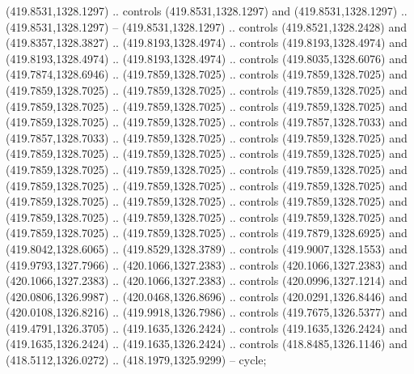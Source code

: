 \begin{scope}[shift={(-343.28256,-575.56596)}]
\begin{scope}[shift={(-736.04956,-3272.8657)}]
\begin{scope}[cm={{0.76602,-0.43388,0.43388,0.76602,(334.73826,3088.862)}}]
        (419.8531,1328.1297) .. controls (419.8531,1328.1297) and (419.8531,1328.1297)
        .. (419.8531,1328.1297) -- (419.8531,1328.1297) .. controls
        (419.8521,1328.2428) and (419.8357,1328.3827) .. (419.8193,1328.4974) ..
        controls (419.8193,1328.4974) and (419.8193,1328.4974) .. (419.8193,1328.4974)
        .. controls (419.8035,1328.6076) and (419.7874,1328.6946) ..
        (419.7859,1328.7025) .. controls (419.7859,1328.7025) and (419.7859,1328.7025)
        .. (419.7859,1328.7025) .. controls (419.7859,1328.7025) and
        (419.7859,1328.7025) .. (419.7859,1328.7025) .. controls (419.7859,1328.7025)
        and (419.7859,1328.7025) .. (419.7859,1328.7025) .. controls
        (419.7857,1328.7033) and (419.7857,1328.7033) .. (419.7859,1328.7025) ..
        controls (419.7859,1328.7025) and (419.7859,1328.7025) .. (419.7859,1328.7025)
        .. controls (419.7859,1328.7025) and (419.7859,1328.7025) ..
        (419.7859,1328.7025) .. controls (419.7859,1328.7025) and (419.7859,1328.7025)
        .. (419.7859,1328.7025) .. controls (419.7859,1328.7025) and
        (419.7859,1328.7025) .. (419.7859,1328.7025) .. controls (419.7859,1328.7025)
        and (419.7859,1328.7025) .. (419.7859,1328.7025) .. controls
        (419.7859,1328.7025) and (419.7859,1328.7025) .. (419.7859,1328.7025) ..
        controls (419.7879,1328.6925) and (419.8042,1328.6065) .. (419.8529,1328.3789)
        .. controls (419.9007,1328.1553) and (419.9793,1327.7966) ..
        (420.1066,1327.2383) .. controls (420.1066,1327.2383) and (420.1066,1327.2383)
        .. (420.1066,1327.2383) .. controls (420.0996,1327.1214) and
        (420.0806,1326.9987) .. (420.0468,1326.8696) .. controls (420.0291,1326.8446)
        and (420.0108,1326.8216) .. (419.9918,1326.7986) .. controls
        (419.7675,1326.5377) and (419.4791,1326.3705) .. (419.1635,1326.2424) ..
        controls (419.1635,1326.2424) and (419.1635,1326.2424) .. (419.1635,1326.2424)
        .. controls (418.8485,1326.1146) and (418.5112,1326.0272) ..
        (418.1979,1325.9299) -- cycle;


\end{scope}
\end{scope}
\end{scope}
